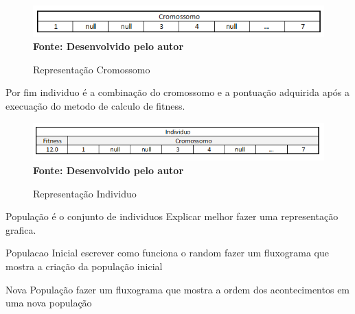 \documentclass{abntpuc}
\begin{document}
\begin{figure}[!htb]
\caption[Representação Cromossomo]{Representação Cromossomo}
\label{fig:figura6}
\centering
\includegraphics[scale=0.8]{imagens/representacaoCromossomo.png}
\\ \textbf{\footnotesize Fonte: Desenvolvido pelo autor}
\end{figure}

Por fim individuo é a combinação do cromossomo e a pontuação adquirida após a execuação do metodo de calculo de fitness.\par

\begin{figure}[!htb]
\caption[Representação Individuo]{Representação Individuo}
\label{fig:figura7}
\centering
\includegraphics[scale=0.8]{imagens/representacaoIndividuo.png}
\\ \textbf{\footnotesize Fonte: Desenvolvido pelo autor}
\end{figure}


População é o conjunto de individuos Explicar melhor fazer uma representação grafica.\par

Populacao Inicial  escrever como funciona o random fazer um fluxograma que mostra a criação da população inicial\par

Nova População fazer um fluxograma que mostra a ordem dos acontecimentos em uma nova população \par
\end{document}
